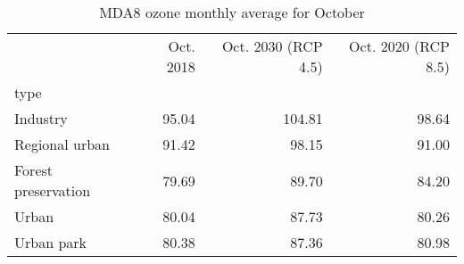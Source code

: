 \begin{table}
\centering
\caption{MDA8 ozone monthly average for October}
\label{o3_oct_type}
\begin{tabular}{lrrr}
\toprule
{} &  Oct. 2018 &  Oct. 2030 (RCP 4.5) &  Oct. 2020 (RCP 8.5) \\
type                &            &                      &                      \\
\midrule
Industry            &      95.04 &               104.81 &                98.64 \\
Regional urban      &      91.42 &                98.15 &                91.00 \\
Forest preservation &      79.69 &                89.70 &                84.20 \\
Urban               &      80.04 &                87.73 &                80.26 \\
Urban park          &      80.38 &                87.36 &                80.98 \\
\bottomrule
\end{tabular}
\end{table}

